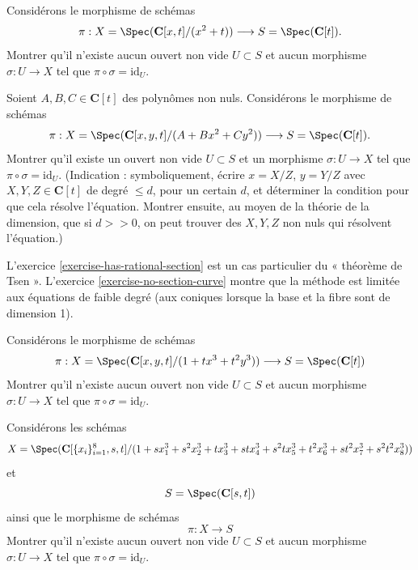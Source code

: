 \begin{exercise}
\label{exercise-no-rational-section}
Considérons le morphisme de schémas
$$
\pi :
X = \Spec(\mathbf{C}[x, t]/(x^2 + t))
\longrightarrow
S = \Spec(\mathbf{C}[t]).
$$
Montrer qu'il n'existe aucun ouvert non vide $U \subset S$ et
aucun morphisme $\sigma : U \to X$ tel que $\pi \circ \sigma = \text{id}_U$.
\end{exercise}

\begin{exercise}
\label{exercise-has-rational-section}
Soient $A, B, C \in \mathbf{C}[t]$ des polynômes non nuls.
Considérons le morphisme de schémas
$$
\pi :
X = \Spec(\mathbf{C}[x, y, t]/(A + Bx^2 + Cy^2))
\longrightarrow
S = \Spec(\mathbf{C}[t]).
$$
Montrer qu'il existe un ouvert non vide $U \subset S$ et
un morphisme $\sigma : U \to X$ tel que $\pi \circ \sigma = \text{id}_U$.
(Indication : symboliquement, écrire $x = X/Z$, $y = Y/Z$ avec
$X, Y, Z \in \mathbf{C}[t]$ de degré $\leq d$, pour un certain $d$,
et déterminer la condition pour que cela résolve l'équation.
Montrer ensuite, au moyen de la théorie de la dimension, que si $d >> 0$, on peut trouver
des $X, Y, Z$ non nuls qui résolvent l'équation.)
\end{exercise}

\begin{remark}
\label{remark-tsen}
L'exercice \ref{exercise-has-rational-section}
est un cas particulier du « théorème de Tsen ».
L'exercice \ref{exercise-no-section-curve} montre que la
méthode est limitée aux équations de faible degré (aux coniques lorsque la base et
la fibre sont de dimension 1).
\end{remark}

\begin{exercise}
\label{exercise-no-section-curve}
Considérons le morphisme de schémas
$$
\pi :
X = \Spec(\mathbf{C}[x, y, t]
/(1 + t x^3 + t^2 y^3))
\longrightarrow
S = \Spec(\mathbf{C}[t])
$$
Montrer qu'il n'existe aucun ouvert non vide $U \subset S$ et
aucun morphisme $\sigma : U \to X$ tel que $\pi \circ \sigma = \text{id}_U$.
\end{exercise}

\begin{exercise}
\label{exercise-no-section-surface}
Considérons les schémas
$$
X = \Spec(\mathbf{C}[\{x_i\}_{i = 1}^{8}, s, t]
/(1 + s x_1^3 + s^2 x_2^3 +
t x_3^3 + st x_4^3 + s^2t x_5^3 +
t^2 x_6^3 + st^2 x_7^3 + s^2t^2 x_8^3))
$$
et
$$
S = \Spec(\mathbf{C}[s, t])
$$
ainsi que le morphisme de schémas
$$
\pi : X \longrightarrow S
$$
Montrer qu'il n'existe aucun ouvert non vide $U \subset S$ et
aucun morphisme $\sigma : U \to X$ tel que $\pi \circ \sigma = \text{id}_U$.
\end{exercise}

